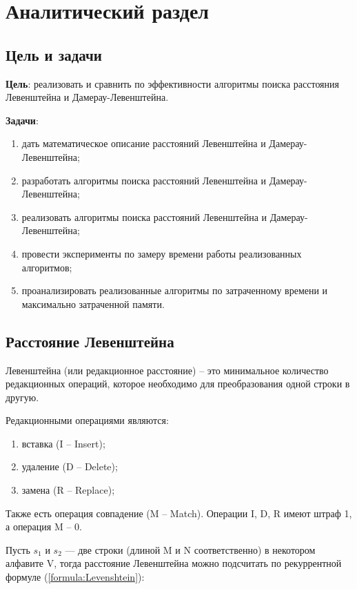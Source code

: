 \chapter{Аналитический раздел}
\label{cha:analytical}
    \section{Цель и задачи}

    {\bf Цель}: реализовать и сравнить по эффективности алгоритмы поиска
    расстояния Левенштейна и Дамерау-Левенштейна.

    {\bf Задачи}:
    \begin{enumerate}
        \item дать математическое описание расстояний Левенштейна и Дамерау-Левенштейна;
        \item разработать алгоритмы поиска расстояний Левенштейна и Дамерау-Левенштейна;
        \item реализовать алгоритмы поиска расстояний Левенштейна и Дамерау-Левенштейна;
        \item провести эксперименты по замеру времени работы реализованных алгоритмов;
        \item проанализировать реализованные алгоритмы по затраченному времени и максимально затраченной памяти.
    \end{enumerate}

    \section{Расстояние Левенштейна}

    { Левенштейна} (или редакционное расстояние) -- это минимальное
    количество редакционных операций, которое необходимо для преобразования одной строки в другую.

    Редакционными операциями являются: \begin{enumerate}
        \item вставка (I -- Insert);
        \item удаление (D -- Delete);
        \item замена (R -- Replace);
    \end{enumerate}

    Также есть операция совпадение (M -- Match).
    Операции I, D, R имеют штраф 1, а операция M -- 0.

    Пусть $s_{1}$ и $s_{2}$ — две строки (длиной M и N соответственно) в некотором алфавите V,
    тогда расстояние Левенштейна можно подсчитать по рекуррентной формуле (\ref{formula:Levenshtein}):

